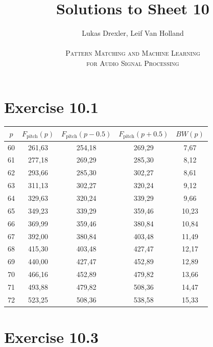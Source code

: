 \documentclass[12pt]{article}
\begin{document}
\title{Solutions to Sheet 10}
\author{Lukas Drexler, Leif Van Holland \\ \\
\textsc{Pattern Matching and Machine Learning} \\
\textsc{for Audio Signal Processing}}
\maketitle

\section*{Exercise 10.1}
\begin{center}
\begin{tabular}{c|c|c|c|c}
    $p$ & $F_{\text{pitch}}(p)$ & $F_{\text{pitch}}(p-0.5)$ & $F_{\text{pitch}}(p+0.5)$ & $BW(p)$ \\
    \hline
    60 & 261,63 & 254,18 & 269,29 & 7,67 \\
    61 & 277,18 & 269,29 & 285,30 & 8,12 \\
    62 & 293,66 & 285,30 & 302,27 & 8,61 \\
    63 & 311,13 & 302,27 & 320,24 & 9,12 \\
    64 & 329,63 & 320,24 & 339,29 & 9,66 \\
    65 & 349,23 & 339,29 & 359,46 & 10,23 \\
    66 & 369,99 & 359,46 & 380,84 & 10,84 \\
    67 & 392,00 & 380,84 & 403,48 & 11,49 \\
    68 & 415,30 & 403,48 & 427,47 & 12,17 \\
    69 & 440,00 & 427,47 & 452,89 & 12,89 \\
    70 & 466,16 & 452,89 & 479,82 & 13,66 \\
    71 & 493,88 & 479,82 & 508,36 & 14,47 \\
    72 & 523,25 & 508,36 & 538,58 & 15,33

\end{tabular}
\end{center}

\section*{Exercise 10.3}
\end{document}
